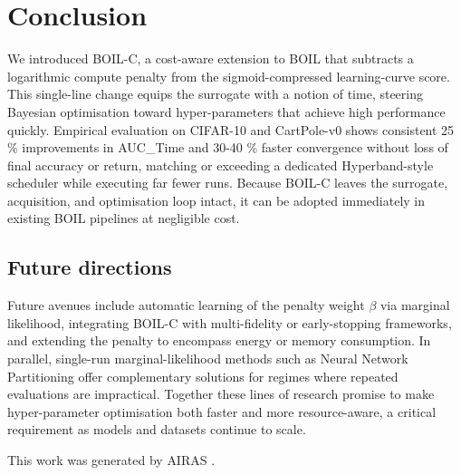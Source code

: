 \documentclass{article} %
\begin{document}
\section{Conclusion}
\label{sec:conclusion}
We introduced BOIL-C, a cost-aware extension to BOIL that subtracts a logarithmic compute penalty from the sigmoid-compressed learning-curve score. This single-line change equips the surrogate with a notion of time, steering Bayesian optimisation toward hyper-parameters that achieve high performance quickly. Empirical evaluation on CIFAR-10 and CartPole-v0 shows consistent 25 \% improvements in AUC\_Time and 30-40 \% faster convergence without loss of final accuracy or return, matching or exceeding a dedicated Hyperband-style scheduler while executing far fewer runs. Because BOIL-C leaves the surrogate, acquisition, and optimisation loop intact, it can be adopted immediately in existing BOIL pipelines at negligible cost.

\subsection{Future directions}
Future avenues include automatic learning of the penalty weight \(\beta\) via marginal likelihood, integrating BOIL-C with multi-fidelity or early-stopping frameworks, and extending the penalty to encompass energy or memory consumption. In parallel, single-run marginal-likelihood methods such as Neural Network Partitioning \cite{mlodozeniec-2023-hyperparameter} offer complementary solutions for regimes where repeated evaluations are impractical. Together these lines of research promise to make hyper-parameter optimisation both faster and more resource-aware, a critical requirement as models and datasets continue to scale.

This work was generated by \textsc{AIRAS} \citep{airas2025}.



\end{document}
